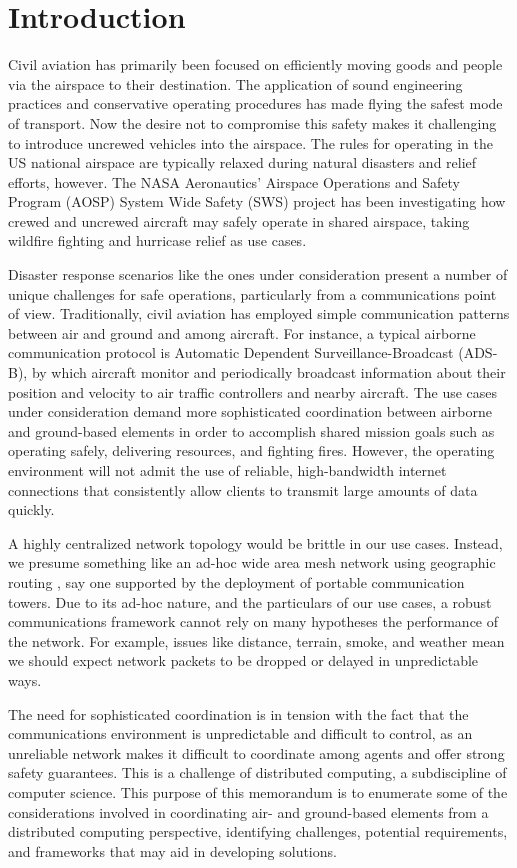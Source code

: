 \section{Introduction}
Civil aviation has primarily been focused on efficiently moving goods
and people via the airspace to their destination. The application of
sound engineering practices and conservative operating procedures has
made flying the safest mode of transport. Now the desire not to
compromise this safety makes it challenging to introduce uncrewed
vehicles into the airspace. The rules for operating in the US national
airspace are typically relaxed during natural disasters and relief
efforts, however. The NASA Aeronautics' Airspace Operations and Safety
Program (AOSP) System Wide Safety (SWS) project has been investigating
how crewed and uncrewed aircraft may safely operate in shared
airspace, taking wildfire fighting and hurricase relief as use cases.

Disaster response scenarios like the ones under consideration present
a number of unique challenges for safe operations, particularly from a
communications point of view. Traditionally, civil aviation has
employed simple communication patterns between air and ground and
among aircraft. For instance, a typical airborne communication
protocol is Automatic Dependent Surveillance-Broadcast (ADS-B), by
which aircraft monitor and periodically broadcast information about
their position and velocity to air traffic controllers and nearby
aircraft. The use cases under consideration demand more sophisticated
coordination between airborne and ground-based elements in order to
accomplish shared mission goals such as operating safely, delivering
resources, and fighting fires. However, the operating environment will
not admit the use of reliable, high-bandwidth internet connections
that consistently allow clients to transmit large amounts of data
quickly.

A highly centralized network topology would be brittle in our use
cases. Instead, we presume something like an ad-hoc wide area mesh
network using geographic routing \cite{}, say one supported by the
deployment of portable communication towers. Due to its ad-hoc nature,
and the particulars of our use cases, a robust communications
framework cannot rely on many hypotheses the performance of the
network. For example, issues like distance, terrain, smoke, and
weather mean we should expect network packets to be dropped or delayed
in unpredictable ways.

The need for sophisticated coordination is in tension with the fact
that the communications environment is unpredictable and difficult to
control, as an unreliable network makes it difficult to coordinate
among agents and offer strong safety guarantees. This is a challenge
of distributed computing, a subdiscipline of computer science. This
purpose of this memorandum is to enumerate some of the considerations
involved in coordinating air- and ground-based elements from a
distributed computing perspective, identifying challenges, potential
requirements, and frameworks that may aid in developing solutions.

